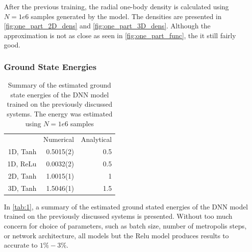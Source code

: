 After the previous training, the radial one-body density is calculated using $N=1e6$ samples generated by the model. The densities are presented in \autoref{fig:one_part_2D_dens} and \autoref{fig:one_part_3D_dens}. Although the approximation is not as close as seen in \autoref{fig:one_part_func}, the it still fairly good. 

\subsubsection{Ground State Energies}

\begin{table}[ht]
	\begin{tabular}{r|rr}
		\toprule
		           & Numerical & Analytical \\
		1D, Tanh   & 0.5015(2) &   0.5      \\
		1D, ReLu   & 0.0032(2) &   0.5      \\
		2D, Tanh   & 1.0015(1) &   1        \\
		3D, Tanh   & 1.5046(1) &   1.5      \\
		\bottomrule
	\end{tabular}
	\caption{Summary of the estimated ground state energies of the DNN model trained on the previously discussed systems. The energy was estimated using $N=1e6$ samples}
	\label{tab:1}
\end{table}

In \autoref{tab:1}, a summary of the estimated ground stated energies of the DNN model trained on the previously discussed systems is presented. Without too much concern for choice of parameters, such as batch size, number of metropolis steps, or network architecture, all models but the Relu model produces results to accurate to $1\%-3\%$.


